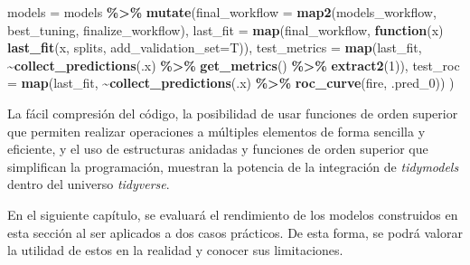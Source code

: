\documentclass[12pt,a4paper,]{book}
\newenvironment{Shaded}{\begin{snugshade}}{\end{snugshade}}
\newcommand{\AttributeTok}[1]{\textcolor[rgb]{0.13,0.29,0.53}{#1}}
\newcommand{\ControlFlowTok}[1]{\textcolor[rgb]{0.13,0.29,0.53}{\textbf{#1}}}
\newcommand{\DecValTok}[1]{\textcolor[rgb]{0.00,0.00,0.81}{#1}}
\newcommand{\FunctionTok}[1]{\textcolor[rgb]{0.13,0.29,0.53}{\textbf{#1}}}
\newcommand{\NormalTok}[1]{#1}
\newcommand{\OtherTok}[1]{\textcolor[rgb]{0.56,0.35,0.01}{#1}}
\newcommand{\SpecialCharTok}[1]{\textcolor[rgb]{0.81,0.36,0.00}{\textbf{#1}}}
\numberwithin{dummy}{section}
\theoremstyle{ocrenumbox}
\theoremstyle{blacknumex}
\theoremstyle{blacknumbox}
\theoremstyle{ocrenum}
\theoremstyle{ocrenum}
\begin{document}
\begin{Shaded}
\begin{Highlighting}[]
\NormalTok{models }\OtherTok{=}\NormalTok{ models }\SpecialCharTok{\%\textgreater{}\%} 
  \FunctionTok{mutate}\NormalTok{(}\AttributeTok{final\_workflow =} \FunctionTok{map2}\NormalTok{(models\_workflow, }
\NormalTok{                               best\_tuning, }
\NormalTok{                               finalize\_workflow),}
         \AttributeTok{last\_fit =} \FunctionTok{map}\NormalTok{(final\_workflow, }
                        \ControlFlowTok{function}\NormalTok{(x) }\FunctionTok{last\_fit}\NormalTok{(x,}
\NormalTok{                                             splits,}
                                             \AttributeTok{add\_validation\_set=}\NormalTok{T)),}
         \AttributeTok{test\_metrics =} \FunctionTok{map}\NormalTok{(last\_fit,      }
                            \SpecialCharTok{\textasciitilde{}}\FunctionTok{collect\_predictions}\NormalTok{(.x) }\SpecialCharTok{\%\textgreater{}\%}  
                              \FunctionTok{get\_metrics}\NormalTok{() }\SpecialCharTok{\%\textgreater{}\%}  
                              \FunctionTok{extract2}\NormalTok{(}\DecValTok{1}\NormalTok{)), }
         \AttributeTok{test\_roc =} \FunctionTok{map}\NormalTok{(last\_fit,}
                        \SpecialCharTok{\textasciitilde{}}\FunctionTok{collect\_predictions}\NormalTok{(.x) }\SpecialCharTok{\%\textgreater{}\%}     
                          \FunctionTok{roc\_curve}\NormalTok{(fire, .pred\_0)) }
\NormalTok{         )}
\end{Highlighting}
\end{Shaded}

La fácil compresión del código, la posibilidad de usar funciones de
orden superior que permiten realizar operaciones a múltiples elementos
de forma sencilla y eficiente, y el uso de estructuras anidadas y
funciones de orden superior que simplifican la programación, muestran la
potencia de la integración de \emph{tidymodels} dentro del universo
\emph{tidyverse}.

En el siguiente capítulo, se evaluará el rendimiento de los modelos
construidos en esta sección al ser aplicados a dos casos prácticos. De
esta forma, se podrá valorar la utilidad de estos en la realidad y
conocer sus limitaciones.




%
\end{document}
